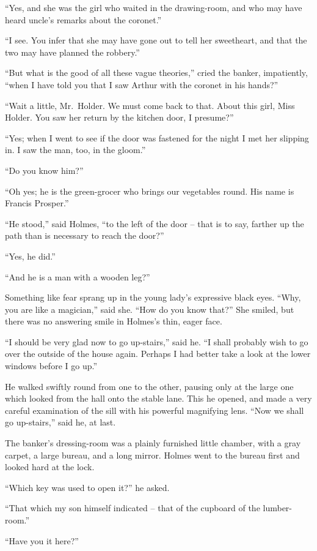 “Yes, and she was the girl who waited in the drawing-room,
and who may have heard uncle’s remarks about the coronet.”

“I see. You infer that she may have gone out to tell her
sweetheart, and that the two may have planned the robbery.”

“But what is the good of all these vague theories,” cried
the banker, impatiently, “when I have told you that I saw
Arthur with the coronet in his hands?”

“Wait a little, Mr.~Holder. We must come back to that.
About this girl, Miss Holder. You saw her return by the
kitchen door, I presume?”

“Yes; when I went to see if the door was fastened for the
night I met her slipping in. I saw the man, too, in the gloom.”

“Do you know him?”

“Oh yes; he is the green-grocer who brings our vegetables
round. His name is Francis Prosper.”

“He stood,” said Holmes, “to the left of the door -- that
is to say, farther up the path than is necess\-ary to reach the
door?”

“Yes, he did.”

“And he is a man with a wooden leg?”

Something like fear sprang up in the young lady’s expressive
black eyes. “Why, you are like a magician,” said she.
“How do you know that?” She smiled, but there was no
answering smile in Holmes’s thin, eager face.

“I should be very glad now to go up-stairs,” said he. “I
shall probably wish to go over the outside of the house again.
Perhaps I had better take a look at the lower windows before
I go up.”

He walked swiftly round from one to the other, pausing
only at the large one which looked from the hall onto the
stable lane. This he opened, and made a very careful examination
of the sill with his powerful magnifying lens. “Now
we shall go up-stairs,” said he, at last.

The banker’s dressing-room was a plainly furnished little
chamber, with a gray carpet, a large bureau, and a long mirror.
Holmes went to the bureau first and looked hard at the
lock.

“Which key was used to open it?” he asked.

“That which my son himself indicated -- that of the cupboard
of the lumber-room.”

“Have you it here?”

